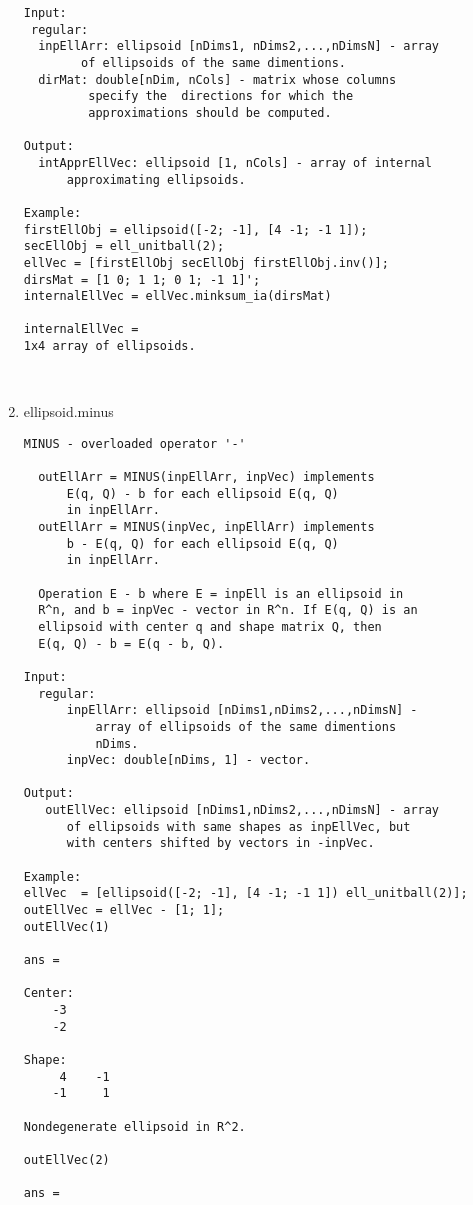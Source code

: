 \begin{enumerate}
\begin{lstlisting}
Input:
 regular:
  inpEllArr: ellipsoid [nDims1, nDims2,...,nDimsN] - array
        of ellipsoids of the same dimentions.
  dirMat: double[nDim, nCols] - matrix whose columns
         specify the  directions for which the
         approximations should be computed.

Output:
  intApprEllVec: ellipsoid [1, nCols] - array of internal
      approximating ellipsoids.

Example:
firstEllObj = ellipsoid([-2; -1], [4 -1; -1 1]);
secEllObj = ell_unitball(2);
ellVec = [firstEllObj secEllObj firstEllObj.inv()];
dirsMat = [1 0; 1 1; 0 1; -1 1]';
internalEllVec = ellVec.minksum_ia(dirsMat)

internalEllVec =
1x4 array of ellipsoids.



\end{lstlisting}
\fontfamily{\familydefault}
\selectfont
\item {ellipsoid.minus}
\selectfont
\begin{lstlisting}
MINUS - overloaded operator '-'

  outEllArr = MINUS(inpEllArr, inpVec) implements
      E(q, Q) - b for each ellipsoid E(q, Q)
      in inpEllArr.
  outEllArr = MINUS(inpVec, inpEllArr) implements
      b - E(q, Q) for each ellipsoid E(q, Q)
      in inpEllArr.

  Operation E - b where E = inpEll is an ellipsoid in
  R^n, and b = inpVec - vector in R^n. If E(q, Q) is an
  ellipsoid with center q and shape matrix Q, then
  E(q, Q) - b = E(q - b, Q).

Input:
  regular:
      inpEllArr: ellipsoid [nDims1,nDims2,...,nDimsN] -
          array of ellipsoids of the same dimentions
          nDims.
      inpVec: double[nDims, 1] - vector.

Output:
   outEllVec: ellipsoid [nDims1,nDims2,...,nDimsN] - array
      of ellipsoids with same shapes as inpEllVec, but
      with centers shifted by vectors in -inpVec.

Example:
ellVec  = [ellipsoid([-2; -1], [4 -1; -1 1]) ell_unitball(2)];
outEllVec = ellVec - [1; 1];
outEllVec(1)

ans =

Center:
    -3
    -2

Shape:
     4    -1
    -1     1

Nondegenerate ellipsoid in R^2.

outEllVec(2)

ans =


\end{lstlisting}
\end{enumerate}

